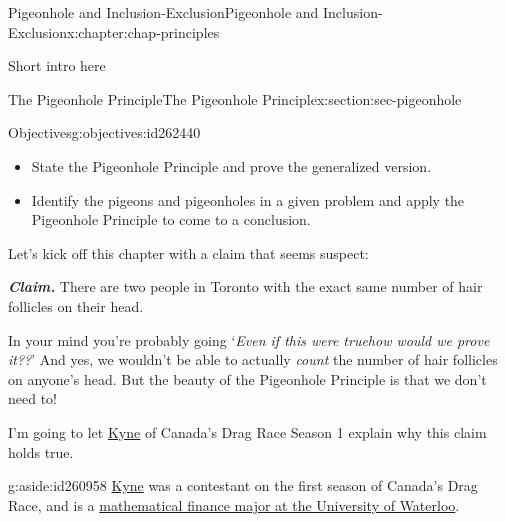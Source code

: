 \documentclass[oneside,10pt,]{book}
\newcommand{\alert}[1]{\textbf{\textit{#1}}}
\numberwithin{equation}{section}
\newlength{\qrsize}
\newlength{\previewwidth}
\begin{document}
\begin{chapterptx}{Pigeonhole and Inclusion-Exclusion}{}{Pigeonhole and Inclusion-Exclusion}{}{}{x:chapter:chap-principles}
\begin{introduction}{}%
Short intro here%
\end{introduction}%
%
%
\typeout{************************************************}
\typeout{************************************************}
%
\begin{sectionptx}{The Pigeonhole Principle}{}{The Pigeonhole Principle}{}{}{x:section:sec-pigeonhole}
\begin{objectives}{Objectives}{g:objectives:id262440}
%
\begin{itemize}[label=\textbullet]
\item{}State the Pigeonhole Principle and prove the generalized version.%
\item{}Identify the pigeons and pigeonholes in a given problem and apply the Pigeonhole Principle to come to a conclusion.%
\end{itemize}
\end{objectives}
Let's kick off this chapter with a claim that seems suspect:%
\par
\alert{Claim.} There are two people in Toronto with the exact same number of hair follicles on their head.%
\par
In your mind you're probably going `\emph{Even if this were true\textellipsis{}how would we prove it??}' And yes, we wouldn't be able to actually \emph{count} the number of hair follicles on anyone's head. But the beauty of the Pigeonhole Principle is that we don't need to!%
\par
I'm going to let \href{https://twitter.com/onlinekyne}{Kyne} of Canada's Drag Race Season 1 explain why this claim holds true.%
\begin{aside}{}{g:aside:id260958}%
\href{https://www.onlinekyne.com/}{Kyne} was a contestant on the first season of Canada's Drag Race, and is a \href{https://uwaterloo.ca/stories/mathematics/university-waterloos-math-student-vying-become-canadas-first}{mathematical finance major at the University of Waterloo}.%
\end{aside}
\begin{sidebyside}{1}{0.1}{0.1}{0}%
\begin{sbspanel}{0.8}%
\setlength{\qrsize}{7.2em}
\setlength{\previewwidth}{\linewidth}
\addtolength{\previewwidth}{-\qrsize}
\begin{tcbraster}[raster columns=2, raster column skip=1pt, raster halign=center, raster force size=false, raster left skip=0pt, raster right skip=0pt]%

\end{tcbraster}
\end{sbspanel}
\end{sidebyside}
\end{sectionptx}
\end{chapterptx}
\end{document}
